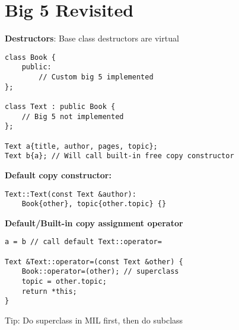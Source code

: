 \documentclass[12pt]{article}
\begin{document}
\section{Big 5 Revisited}
\textbf{Destructors}: Base class destructors are virtual
\begin{lstlisting}
class Book {
    public:
        // Custom big 5 implemented
};

class Text : public Book {
    // Big 5 not implemented
};

Text a{title, author, pages, topic};
Text b{a}; // Will call built-in free copy constructor
\end{lstlisting}
\textbf{Default copy constructor:}
\begin{lstlisting}
Text::Text(const Text &author):
    Book{other}, topic{other.topic} {}
\end{lstlisting}

\textbf{Default/Built-in copy assignment operator}
\begin{lstlisting}
a = b // call default Text::operator=

Text &Text::operator=(const Text &other) {
    Book::operator=(other); // superclass
    topic = other.topic;
    return *this;
}
\end{lstlisting}
Tip: Do superclass in MIL first, then do subclass
\\
\end{document}
